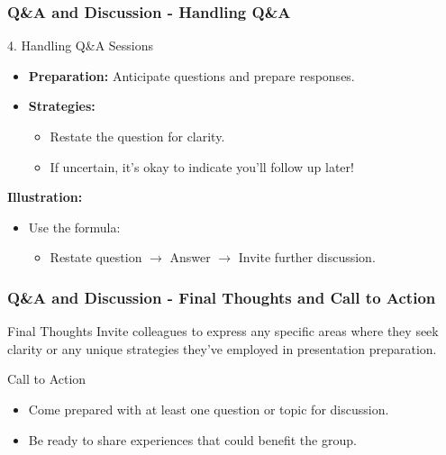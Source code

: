 \documentclass[aspectratio=169]{beamer}
\begin{document}
\begin{frame}[fragile]
    \frametitle{Q\&A and Discussion - Handling Q\&A}
    \begin{block}{4. Handling Q\&A Sessions}
        \begin{itemize}
            \item \textbf{Preparation:} Anticipate questions and prepare responses.
            \item \textbf{Strategies:}
            \begin{itemize}
                \item Restate the question for clarity.
                \item If uncertain, it's okay to indicate you'll follow up later!
            \end{itemize}
        \end{itemize}
        \textbf{Illustration:} 
        \begin{itemize}
            \item Use the formula: 
            \begin{itemize}
                \item Restate question $\rightarrow$ Answer $\rightarrow$ Invite further discussion.
            \end{itemize}
        \end{itemize}
    \end{block}
\end{frame}

\begin{frame}[fragile]
    \frametitle{Q\&A and Discussion - Final Thoughts and Call to Action}
    \begin{block}{Final Thoughts}
        Invite colleagues to express any specific areas where they seek clarity or any unique strategies they've employed in presentation preparation.
    \end{block}

    \begin{block}{Call to Action}
        \begin{itemize}
            \item Come prepared with at least one question or topic for discussion.
            \item Be ready to share experiences that could benefit the group.
        \end{itemize}
    \end{block}
\end{frame}
\end{document}
